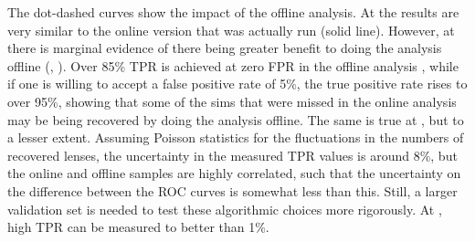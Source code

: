 \documentclass[useAMS,usenatbib,a4paper]{mn2e}
\begin{document}
The dot-dashed curves show the impact of the offline analysis. At \StageOne the
results are very similar to the online version that was actually run (solid
line). However, at \StageTwo there is marginal evidence of there being greater
benefit to doing the analysis offline (, ).
Over 85\% TPR is achieved at zero FPR in the offline analysis , while if one is
willing to accept a false positive rate of 5\%, the true positive rate rises to
over 95\%, showing that some of the sims that were missed in the online analysis
may be being recovered by doing the analysis offline. The same is true at
\StageOne, but to a lesser extent. Assuming Poisson statistics for the
fluctuations in the numbers of recovered lenses, the uncertainty in the measured
\StageTwo TPR values is around 8\%, but the online and offline samples are
highly correlated, such that the uncertainty on the difference between the ROC
curves is somewhat less than this. Still, a larger validation set is needed to
test these algorithmic choices more rigorously. At \StageOne, high TPR can be
measured to better than 1\%.
\end{document}
